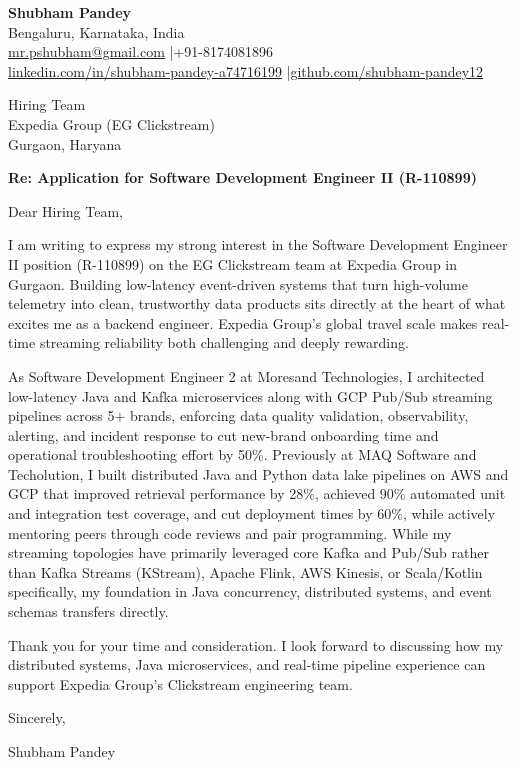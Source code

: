 \documentclass[a4paper,11pt]{article}
\begin{document}
\textbf{Shubham Pandey} \\
Bengaluru, Karnataka, India \\
\href{mailto:mr.pshubham@gmail.com}{mr.pshubham@gmail.com} \quad|\quad +91-8174081896 \\
\href{https://www.linkedin.com/in/shubham-pandey-a74716199/}{linkedin.com/in/shubham-pandey-a74716199} \quad|\quad \href{https://github.com/shubham-pandey12}{github.com/shubham-pandey12}

\vspace{1em}

Hiring Team \\
Expedia Group (EG Clickstream) \\
Gurgaon, Haryana

\vspace{1em}

\textbf{Re: Application for Software Development Engineer II (R-110899)}

Dear Hiring Team,

I am writing to express my strong interest in the Software Development Engineer II position (R-110899) on the EG Clickstream team at Expedia Group in Gurgaon. Building low-latency event-driven systems that turn high-volume telemetry into clean, trustworthy data products sits directly at the heart of what excites me as a backend engineer. Expedia Group's global travel scale makes real-time streaming reliability both challenging and deeply rewarding.

As Software Development Engineer 2 at Moresand Technologies, I architected low-latency Java and Kafka microservices along with GCP Pub/Sub streaming pipelines across 5+ brands, enforcing data quality validation, observability, alerting, and incident response to cut new-brand onboarding time and operational troubleshooting effort by 50\%. Previously at MAQ Software and Techolution, I built distributed Java and Python data lake pipelines on AWS and GCP that improved retrieval performance by 28\%, achieved 90\% automated unit and integration test coverage, and cut deployment times by 60\%, while actively mentoring peers through code reviews and pair programming. While my streaming topologies have primarily leveraged core Kafka and Pub/Sub rather than Kafka Streams (KStream), Apache Flink, AWS Kinesis, or Scala/Kotlin specifically, my foundation in Java concurrency, distributed systems, and event schemas transfers directly.

Thank you for your time and consideration. I look forward to discussing how my distributed systems, Java microservices, and real-time pipeline experience can support Expedia Group's Clickstream engineering team.

\vspace{1em}

Sincerely,

Shubham Pandey
\end{document}
